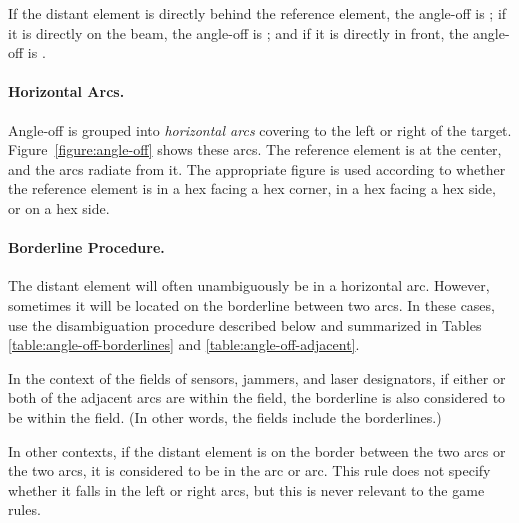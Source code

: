 {If the distant element is directly behind the reference element, the angle-off is ; if it is directly on the beam, the angle-off is ; and if it is directly in front, the angle-off is .

\paragraph{Horizontal Arcs.} 

Angle-off is grouped into \emph{horizontal arcs} covering  to the left or right of the target. Figure~\ref{figure:angle-off} shows these arcs. The reference element is at the center, and the arcs radiate from it. The appropriate figure is used according to whether the reference element is in a hex facing a hex corner, in a hex facing a hex side, or on a hex side.

\paragraph{Borderline Procedure.} 

The distant element will often unambiguously be in a horizontal arc. However, sometimes it will be located on the borderline between two arcs. In these cases, use the disambiguation procedure described below and summarized in Tables \ref{table:angle-off-borderlines} and \ref{table:angle-off-adjacent}.

In the context of the fields of sensors, jammers, and laser designators, if either or both of the adjacent arcs are within the field, the borderline is also considered to be within the field. (In other words, the fields include the borderlines.)

In other contexts, if the distant element is on the border between the two  arcs or the two  arcs, it is considered to be in the  arc or  arc. This rule does not specify whether it falls in the left or right arcs, but this is never relevant to the game rules. 


}
